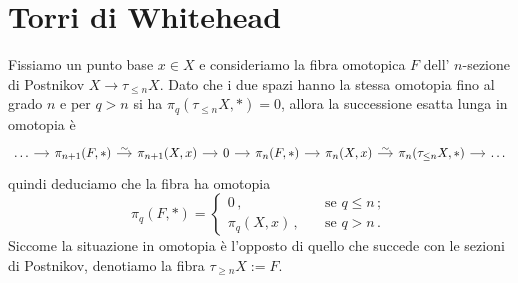 
%
%
%
%

\section{Torri di Whitehead}


Fissiamo un punto base $x \in X$ e consideriamo la fibra omotopica $F$
dell' $n$-sezione di Postnikov $X \to \tau_{\le n} X$.
Dato che i due spazi hanno la stessa omotopia fino al
grado $n$ e per $q > n$ si ha $\pi_{q}(\tau_{\le n} X,\ast) = 0$,
allora la successione esatta lunga in omotopia è
\begin{equation*}
	\begin{tikzcd}[column sep=small]
		\dots \ar[r] & \pi_{n+1}(F,\ast) \ar[r, "\sim"]
		& \pi_{n+1}(X,x) \ar[r]
		& 0 \ar[r]
		& \pi_{n}(F,\ast) \ar[r]
		& \pi_{n}(X,x) \ar[r, "\sim"]
		& \pi_{n}(\tau_{\le n} X,\ast) \ar[r]
		& \dots
	\end{tikzcd}
\end{equation*}
quindi deduciamo che la fibra ha omotopia
\begin{equation*}
	\pi_{q}(F,\ast) =
	\begin{cases}
		0\,, \quad & \text{se } q \le n\,; \\
		\pi_{q}(X,x)\,, \quad & \text{se } q > n\,.
	\end{cases}
\end{equation*}
Siccome la situazione in omotopia è l'opposto di quello che succede
con le sezioni di Postnikov, denotiamo la fibra $\tau_{\ge n} X := F$.


